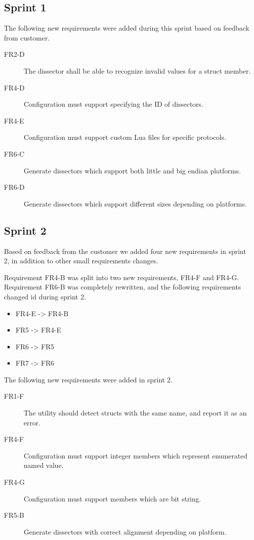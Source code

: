 \subsection{Sprint 1}
\label{sec:req:sprint1evo}
The following new requirements were added during this sprint based on feedback from customer.
\begin{description}
	\item[FR2-D] The dissector shall be able to recognize invalid values for a struct member.
	\item[FR4-D] Configuration must support specifying the ID of dissectors.
	\item[FR4-E] Configuration must support custom Lua files for specific protocols.
	\item[FR6-C] Generate dissectors which support both little and big endian platforms.
	\item[FR6-D] Generate dissectors which support different sizes depending on platforms.
\end{description}

\subsection{Sprint 2}
\label{sec:req:sprint1evo}
\label{sec:req:sprint2evo}
Based on feedback from the customer we added four new requirements in sprint
2, in addition to other small requirements changes.

Requirement FR4-B was split into two new requirements, FR4-F and FR4-G.
Requirement FR6-B was completely rewritten, and the following requirements
changed id during sprint 2.
\begin{itemize}
	\item FR4-E -> FR4-B
	\item FR5 -> FR4-E
	\item FR6 -> FR5
	\item FR7 -> FR6
\end{itemize}
The following new requirements were added in sprint 2.
\begin{description}
	\item[FR1-F] The utility should detect structs with the same name, and report it as an error.
	\item[FR4-F] Configuration must support integer members which represent enumerated named value.	
	\item[FR4-G] Configuration must support members which are bit string.
	\item[FR5-B] Generate dissectors with correct alignment depending on platform.
\end{description}


